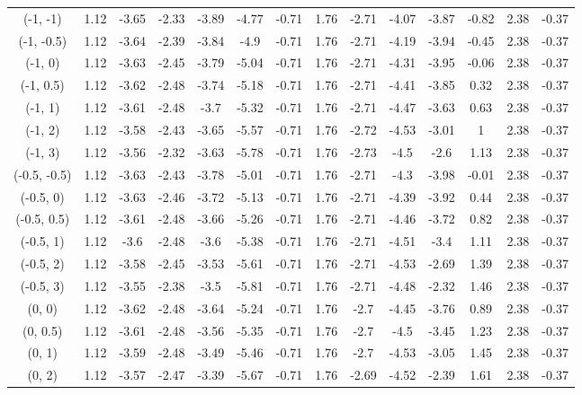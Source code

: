 \documentclass[11pt,a4paper,twoside,openany]{book}\usepackage{knitr}
\begin{document}
{\begin{knitrout}
\begin{landscape}
\begin{longtable}[t]{cccccccccccccc}
(-1, -1) & 1.12 & -3.65 & -2.33 & -3.89 & -4.77 & -0.71 & 1.76 & -2.71 & -4.07 & -3.87 & -0.82 & 2.38 & -0.37\\
(-1, -0.5) & 1.12 & -3.64 & -2.39 & -3.84 & -4.9 & -0.71 & 1.76 & -2.71 & -4.19 & -3.94 & -0.45 & 2.38 & -0.37\\
\addlinespace
(-1, 0) & 1.12 & -3.63 & -2.45 & -3.79 & -5.04 & -0.71 & 1.76 & -2.71 & -4.31 & -3.95 & -0.06 & 2.38 & -0.37\\
(-1, 0.5) & 1.12 & -3.62 & -2.48 & -3.74 & -5.18 & -0.71 & 1.76 & -2.71 & -4.41 & -3.85 & 0.32 & 2.38 & -0.37\\
(-1, 1) & 1.12 & -3.61 & -2.48 & -3.7 & -5.32 & -0.71 & 1.76 & -2.71 & -4.47 & -3.63 & 0.63 & 2.38 & -0.37\\
(-1, 2) & 1.12 & -3.58 & -2.43 & -3.65 & -5.57 & -0.71 & 1.76 & -2.72 & -4.53 & -3.01 & 1 & 2.38 & -0.37\\
(-1, 3) & 1.12 & -3.56 & -2.32 & -3.63 & -5.78 & -0.71 & 1.76 & -2.73 & -4.5 & -2.6 & 1.13 & 2.38 & -0.37\\
\addlinespace
(-0.5, -0.5) & 1.12 & -3.63 & -2.43 & -3.78 & -5.01 & -0.71 & 1.76 & -2.71 & -4.3 & -3.98 & -0.01 & 2.38 & -0.37\\
(-0.5, 0) & 1.12 & -3.63 & -2.46 & -3.72 & -5.13 & -0.71 & 1.76 & -2.71 & -4.39 & -3.92 & 0.44 & 2.38 & -0.37\\
(-0.5, 0.5) & 1.12 & -3.61 & -2.48 & -3.66 & -5.26 & -0.71 & 1.76 & -2.71 & -4.46 & -3.72 & 0.82 & 2.38 & -0.37\\
(-0.5, 1) & 1.12 & -3.6 & -2.48 & -3.6 & -5.38 & -0.71 & 1.76 & -2.71 & -4.51 & -3.4 & 1.11 & 2.38 & -0.37\\
(-0.5, 2) & 1.12 & -3.58 & -2.45 & -3.53 & -5.61 & -0.71 & 1.76 & -2.71 & -4.53 & -2.69 & 1.39 & 2.38 & -0.37\\
\addlinespace
(-0.5, 3) & 1.12 & -3.55 & -2.38 & -3.5 & -5.81 & -0.71 & 1.76 & -2.71 & -4.48 & -2.32 & 1.46 & 2.38 & -0.37\\
(0, 0) & 1.12 & -3.62 & -2.48 & -3.64 & -5.24 & -0.71 & 1.76 & -2.7 & -4.45 & -3.76 & 0.89 & 2.38 & -0.37\\
(0, 0.5) & 1.12 & -3.61 & -2.48 & -3.56 & -5.35 & -0.71 & 1.76 & -2.7 & -4.5 & -3.45 & 1.23 & 2.38 & -0.37\\
(0, 1) & 1.12 & -3.59 & -2.48 & -3.49 & -5.46 & -0.71 & 1.76 & -2.7 & -4.53 & -3.05 & 1.45 & 2.38 & -0.37\\
(0, 2) & 1.12 & -3.57 & -2.47 & -3.39 & -5.67 & -0.71 & 1.76 & -2.69 & -4.52 & -2.39 & 1.61 & 2.38 & -0.37\\

\end{longtable}
\end{landscape}
\end{knitrout}}
\end{document}
